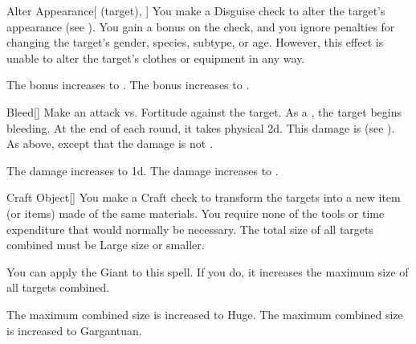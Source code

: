 \lowercase{\hypertarget{spell:Alter Appearance}{}}\label{spell:Alter Appearance}
\begin{attuneability}[Rank 3]{\hypertarget{spell:Alter Appearance}{Alter Appearance}}[ (target), ]
You make a Disguise check to alter the target's appearance (see ).
You gain a  bonus on the check, and you ignore penalties for changing the target's gender, species, subtype, or age.
However, this effect is unable to alter the target's clothes or equipment in any way.

\rankline
{} The bonus increases to .
 The bonus increases to .
\end{attuneability}
\vspace{0.25em}



\lowercase{\hypertarget{spell:Bleed}{}}\label{spell:Bleed}
\begin{freeability}[Rank 4]{\hypertarget{spell:Bleed}{Bleed}}[]
Make an attack vs. Fortitude against the target.
\hit As a , the target begins bleeding.
At the end of each round, it takes physical  \minus2d.
This damage is  (see ).
\crit As above, except that the damage is not .

\rankline
{} The damage increases to  \minus1d.
 The damage increases to .
\end{freeability}
\vspace{0.25em}



\lowercase{\hypertarget{spell:Craft Object}{}}\label{spell:Craft Object}
\begin{freeability}[Rank 4]{\hypertarget{spell:Craft Object}{Craft Object}}[]
You make a Craft check to transform the targets into a new item (or items) made of the same materials.
You require none of the tools or time expenditure that would normally be necessary.
The total size of all targets combined must be Large size or smaller.

You can apply the Giant  to this spell.
If you do, it increases the maximum size of all targets combined.

\rankline
{} The maximum combined size is increased to Huge.
 The maximum combined size is increased to Gargantuan.
\end{freeability}
\vspace{0.25em}



